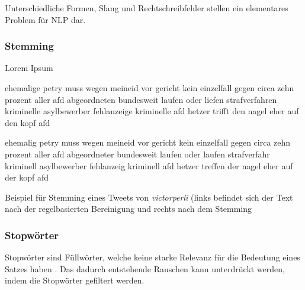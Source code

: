 Unterschiedliche Formen, Slang und Rechtschreibfehler stellen ein elementares Problem für \ac{NLP} dar.

\subsubsection{Stemming}

Lorem Ipsum


\begin{code}[H]
    \begin{minipage}{0.45\textwidth}
        \small
        ehemalige petry muss wegen meineid vor gericht kein einzelfall gegen circa zehn prozent aller afd abgeordneten bundesweit laufen oder liefen strafverfahren kriminelle asylbewerber fehlanzeige kriminelle afd hetzer trifft den nagel eher auf den kopf afd
    \end{minipage}\hfill
    \begin{minipage}{0.45\textwidth}
        \small
        ehemalig petry muss wegen meineid vor gericht kein einzelfall gegen circa zehn prozent aller afd abgeordneter bundesweit laufen oder laufen strafverfahr kriminell asylbewerber fehlanzeig kriminell afd hetzer treffen der nagel eher auf der kopf afd
    \end{minipage}\hfill
    \caption[Beispiel -- Stemming]{Beispiel für Stemming eines Tweets von \textit{victorperli} (links befindet sich der Text nach der regelbasierten Bereinigung und rechts nach dem Stemming} \label{list:stemming}
\end{code}

\subsubsection{Stopwörter}


Stopwörter sind Füllwörter, welche keine starke Relevanz für die Bedeutung eines Satzes haben \autocite[4]{kowsari_text_2019}. Das dadurch entstehende Rauschen kann unterdrückt werden, indem die Stopwörter gefiltert werden.


